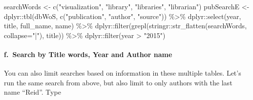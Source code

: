 \documentclass[
]{article}
\newenvironment{Shaded}{\begin{snugshade}}{\end{snugshade}}
\newcommand{\AttributeTok}[1]{\textcolor[rgb]{0.77,0.63,0.00}{#1}}
\newcommand{\FunctionTok}[1]{\textcolor[rgb]{0.00,0.00,0.00}{#1}}
\newcommand{\NormalTok}[1]{#1}
\newcommand{\OtherTok}[1]{\textcolor[rgb]{0.56,0.35,0.01}{#1}}
\newcommand{\SpecialCharTok}[1]{\textcolor[rgb]{0.00,0.00,0.00}{#1}}
\newcommand{\StringTok}[1]{\textcolor[rgb]{0.31,0.60,0.02}{#1}}
\begin{document}
\begin{Shaded}
\begin{Highlighting}[]
\NormalTok{searchWords }\OtherTok{\textless{}{-}} \FunctionTok{c}\NormalTok{(}\StringTok{"visualization"}\NormalTok{, }\StringTok{"library"}\NormalTok{, }\StringTok{"libraries"}\NormalTok{, }\StringTok{"librarian"}\NormalTok{)}
\NormalTok{pubSearchE }\OtherTok{\textless{}{-}}\NormalTok{ dplyr}\SpecialCharTok{::}\FunctionTok{tbl}\NormalTok{(dbWoS, }\FunctionTok{c}\NormalTok{(}\StringTok{"publication"}\NormalTok{, }\StringTok{"author"}\NormalTok{, }\StringTok{"source"}\NormalTok{)) }\SpecialCharTok{\%\textgreater{}\%}
\NormalTok{  dplyr}\SpecialCharTok{::}\FunctionTok{select}\NormalTok{(year, title, full\_name, name) }\SpecialCharTok{\%\textgreater{}\%}
\NormalTok{  dplyr}\SpecialCharTok{::}\FunctionTok{filter}\NormalTok{(}\FunctionTok{grepl}\NormalTok{(stringr}\SpecialCharTok{::}\FunctionTok{str\_flatten}\NormalTok{(searchWords, }\AttributeTok{collapse=}\StringTok{"|"}\NormalTok{), title)) }\SpecialCharTok{\%\textgreater{}\%}
\NormalTok{  dplyr}\SpecialCharTok{::}\FunctionTok{filter}\NormalTok{(year }\SpecialCharTok{\textgreater{}} \StringTok{"2015"}\NormalTok{)}
\end{Highlighting}
\end{Shaded}

\hypertarget{f.-search-by-title-words-year-and-author-name}{%
\paragraph{f.~Search by Title words, Year and Author
name}\label{f.-search-by-title-words-year-and-author-name}}

You can also limit searches based on information in these multiple
tables. Let's run the same search from above, but also limit to only
authors with the last name ``Reid''. Type
\end{document}
